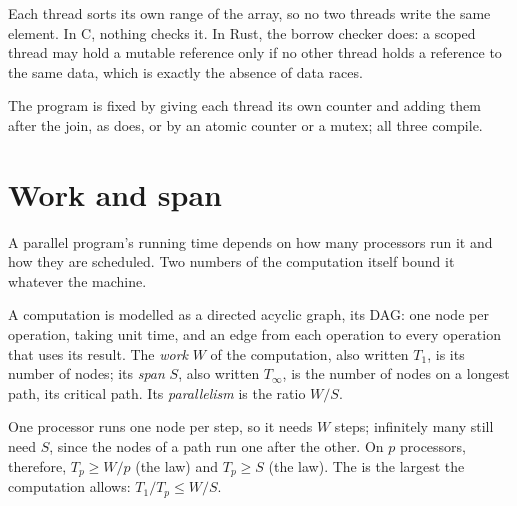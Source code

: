 Each thread sorts its own range of the array, so no two threads write the same element. In C, nothing checks it. In Rust, the borrow checker does: a scoped thread may hold a mutable reference only if no other thread holds a reference to the same data, which is exactly the absence of data races.

\label{lst:b3:parallel-programming:race}

\label{out:b3:parallel-programming:race}

The program is fixed by giving each thread its own counter and adding them after the join, as  does, or by an atomic counter or a mutex; all three compile.

\section{Work and span}\label{sec:b3:parallel-programming:workspan}

A parallel program's running time depends on how many processors run it and how they are scheduled. Two numbers of the computation itself bound it whatever the machine.

\begin{definition}\label{def:b3:parallel-programming:workspan}
A computation is modelled as a directed acyclic graph, its DAG: one node per operation, taking unit time, and an edge from each operation to every operation that uses its result. The \emph{work} $W$ of the computation, also written $T_1$, is its number of nodes; its \emph{span} $S$, also written $T_\infty$, is the number of nodes on a longest path, its critical path. Its \emph{parallelism} is the ratio $W / S$.
\end{definition}

One processor runs one node per step, so it needs $W$ steps; infinitely many still need $S$, since the nodes of a path run one after the other. On $p$ processors, therefore, $T_p \ge W/p$ (the  law) and $T_p \ge S$ (the  law). The  is the largest  the computation allows: $T_1 / T_p \le W / S$.

